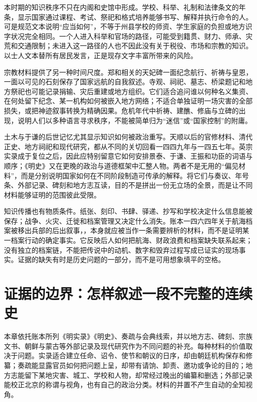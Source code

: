 本时期的知识秩序不只在内阁和史馆中形成。学校、科举、礼制和法律条文的年条，显示国家通过课程、考试、祭祀和格式培养能够书写、解释并执行命令的人。可是规范文本说明“应当如何”，不等于州县学校的师资、学生家庭的负担或地方识字状况完全相同。一个人进入科举和官场的路径，可能受到籍贯、财力、师承、灾荒和交通限制；未进入这一路径的人也不因此没有关于税役、市场和宗教的知识。以士人文本替所有居民发言，正是现存文字丰富所带来的风险。

宗教材料提供了另一种时间尺度。郑和相关的天妃碑一面纪念航行、祈祷与皇恩，一面以可见的石刻保存了国家远航的自我叙述。寺观、祠祀、墓志、桥梁题记和地方祭祀也可能记录捐输、灾后重建或地方组织。它们适合追问谁以何种名义集资、在何处留下纪念、某一机构如何被嵌入地方网络；不适合单独证明一场灾害的全部损失，或把神迹叙事转换为精确因果。危机年代中祈祷、建醮、修庙与立碑的出现，说明人们以多种语言寻求秩序，不能被简单归为“迷信”或“国家控制”的附庸。

土木与于谦的后世记忆尤其显示知识如何被政治重写。天顺以后的官修材料、清代正史、地方祠祀和现代研究，都从不同的关切回看一四四九年与一四五七年。英宗实录成于复位之后，因此应特别留意它如何安排景泰、于谦、王振和功臣的词语与顺序；《明史》又在更晚的政治与道德框架中汇整人物。两者不是无用的“偏见材料”，而是分别说明国家如何在不同阶段制造可传承的解释。将它们与奏议、年号条、外部记录、碑刻和地方志互读，目的不是拼出一份无立场的全景，而是让不同材料能够证明的范围彼此受限。

知识传播也有物质条件。纸张、刻印、书肆、驿递、抄写和学校决定什么信息能被保存；战争、火灾、迁徙和档案管理又决定什么消失。账本一四六四年关于航海档案被移出兵部的后出叙事，，本身就应被当作一条需要辨析的材料，而不是证明某一档案行动的确定事实。它反映后人如何把航海、财政浪费和档案缺失联系起来；没有独立的档案链，不能把传说中的动机、数字和毁弃过程写成已证实的现场事实。证据的缺失有时是历史问题的一部分，而不是可用想象填平的空格。

\section{证据的边界：怎样叙述一段不完整的连续史}

本章依托账本所列《明实录》《明史》、奏疏与会典线索，并以地方志、碑刻、宗族文书、朝鲜与蒙古等外部记录及现代研究作为不同问题的补充。每种材料的价值取决于问题。实录适合建立任命、诏令、使节和朝议的日序，却由朝廷机构保存和修纂；奏疏能显露官员如何把问题上呈，却带有请饷、卸责、邀功或争论的目的；地方志能留下某地灾害、城工、学校和人物，却常经过晚出的编纂和删选；外部记录能校正北京的称谓与视角，也有自己的政治分类。材料的并置不产生自动的全知视角。

